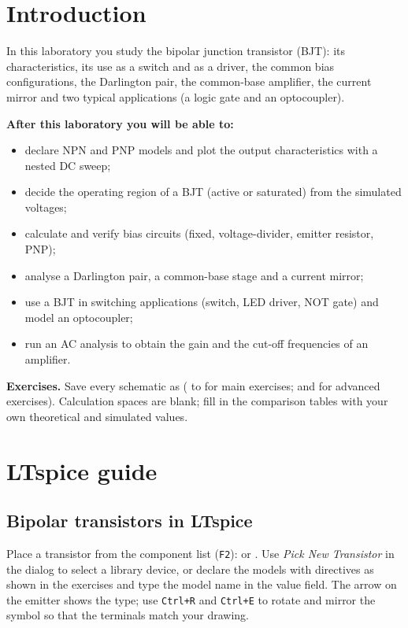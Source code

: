 
\section{Introduction}
In this laboratory you study the bipolar junction transistor (BJT): its characteristics, its use as a switch and as a driver, the common bias configurations, the Darlington pair, the common-base amplifier, the current mirror and two typical applications (a logic gate and an optocoupler).

\textbf{After this laboratory you will be able to:}
\begin{itemize}
  \item declare NPN and PNP models and plot the output characteristics with a nested DC sweep;
  \item decide the operating region of a BJT (active or saturated) from the simulated voltages;
  \item calculate and verify bias circuits (fixed, voltage-divider, emitter resistor, PNP);
  \item analyse a Darlington pair, a common-base stage and a current mirror;
  \item use a BJT in switching applications (switch, LED driver, NOT gate) and model an optocoupler;
  \item run an AC analysis to obtain the gain and the cut-off frequencies of an amplifier.
\end{itemize}

\textbf{Exercises.} Save every schematic as  ( to  for main exercises;  and  for advanced exercises). Calculation spaces are blank; fill in the comparison tables with your own theoretical and simulated values.

\section{LTspice guide}

\subsection{Bipolar transistors in LTspice}
Place a transistor from the component list (\texttt{F2}):  or . Use \textit{Pick New Transistor} in the dialog to select a library device, or declare the models with directives as shown in the exercises and type the model name in the value field. The arrow on the emitter shows the type; use \texttt{Ctrl+R} and \texttt{Ctrl+E} to rotate and mirror the symbol so that the terminals match your drawing.

